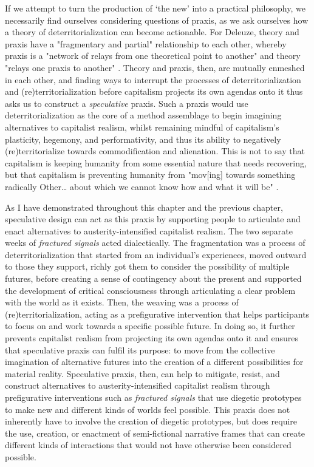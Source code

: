 If we attempt to turn the production of ‘the new' into a practical philosophy, we necessarily find ourselves considering questions of praxis, as we ask ourselves how a theory of deterritorialization can become actionable. For Deleuze, theory and praxis have a "fragmentary and partial" relationship to each other, whereby praxis is a "network of relays from one theoretical point to another" and theory "relays one praxis to another" \citep[p. 206]{deleuze_desert_2004}. Theory and praxis, then, are mutually enmeshed in each other, and finding ways to interrupt the processes of deterritorialization and (re)territorialization before capitalism projects its own agendas onto it thus asks us to construct a \textit{speculative} praxis. Such a praxis would use deterritorialization as the core of a method assemblage \cite{law_after_2004, coleman_introduction_2013, wilkie_speculative_2015} to begin imagining alternatives to capitalist realism, whilst remaining mindful of capitalism’s plasticity, hegemony, and performativity, and thus its ability to negatively (re)territorialize towards commodification and alienation. This is not to say that capitalism is keeping humanity from some essential nature that needs recovering, but that capitalism is preventing humanity from "mov[ing] towards something radically Other… about which we cannot know how and what it will be" \citep[p. 121]{foucault_remarks_1991}. 

As I have demonstrated throughout this chapter and the previous chapter, speculative design can act as this praxis by supporting people to articulate and enact alternatives to austerity-intensified capitalist realism. The two separate weeks of \textit{fractured signals} acted dialectically. The fragmentation was a process of deterritorialization that started from an individual's experiences, moved outward to those they support, richly got them to consider the possibility of multiple futures, before creating a sense of contingency about the present and supported the development of critical consciousness through articulating a clear problem with the world as it exists. Then, the weaving was a process of (re)territorialization, acting as a prefigurative intervention that helps participants to focus on and work towards a specific possible future. In doing so, it further prevents capitalist realism from projecting its own agendas onto it and ensures that speculative praxis can fulfil its purpose: to move from the collective imagination of alternative futures into the creation of a different possibilities for material reality. Speculative praxis, then, can help to mitigate, resist, and construct alternatives to austerity-intensified capitalist realism through prefigurative interventions such as \textit{fractured signals} that use diegetic prototypes to make new and different kinds of worlds feel possible. This praxis does not inherently have to involve the creation of diegetic prototypes, but does require the use, creation, or enactment of semi-fictional narrative frames that can create different kinds of interactions that would not have otherwise been considered possible. 

